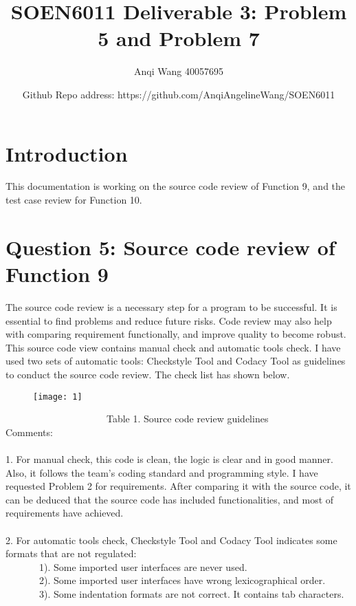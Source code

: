 \documentclass{article}
\title{SOEN6011 Deliverable 3: Problem 5 and Problem 7}
\author{Anqi Wang 40057695  }
\date{Github Repo address: https://github.com/AnqiAngelineWang/SOEN6011}
\begin{document}
\maketitle

\section{Introduction }
This documentation is working on the source code review of Function 9, and the test case review for Function 10.
\section{Question 5: Source code review of Function 9}
The source code review is a necessary step for a program to be successful. It is essential to find problems and reduce future risks. Code review may also help with comparing requirement functionally, and improve quality to become robust. This source code view contains manual check and automatic tools check. I have used two sets of automatic tools: Checkstyle Tool and Codacy Tool as guidelines to conduct the source code review. The check list has shown below. \\


\begin{figure}[h]
\begin{center}
\texttt{[image: 1]} 
\end{center}
\end{figure}

 \ \ \ \ \ \ \ \ \ \ \ \ \ \  \ \ \ \ \ \ \ Table 1. Source code review guidelines \\





Comments: \\ \\
1. For manual check, this code is clean, the logic is clear and in good manner. Also, it follows the team’s coding standard and programming style. I have requested Problem 2 for requirements. After comparing it with the source code, it can be deduced that the source code has included functionalities, and most of requirements have achieved.  \\ \\
2. For automatic tools check, Checkstyle Tool and Codacy Tool indicates some formats that are not regulated:  \\ 
 \ \ \ \ \ \ \ 1).	Some imported user interfaces are never used.  \\
 \ \ \ \ \ \ \ 2).	Some imported user interfaces have wrong lexicographical order.  \\
 \ \ \ \ \ \ \ 3).	Some indentation formats are not correct. It contains tab characters.   \\
\end{document}
